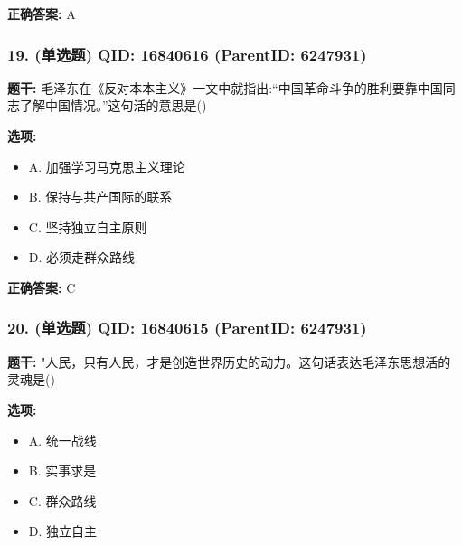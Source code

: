 \documentclass[12pt,UTF8]{ctexart}
\begin{document}
\textbf{正确答案:}
A

\vspace{0.3em}\hrulefill\vspace{0.7em}

\subsubsection*{19. (单选题) \small QID: 16840616 (ParentID: 6247931)}

\textbf{题干:}
毛泽东在《反对本本主义》一文中就指出:“中国革命斗争的胜利要靠中国同志了解中国情况。”这句活的意思是()



\textbf{选项:}
\begin{itemize}[leftmargin=*]

  \item A. 加强学习马克思主义理论

  \item B. 保持与共产国际的联系

  \item C. 坚持独立自主原则

  \item D. 必须走群众路线

\end{itemize}

\textbf{正确答案:}
C

\vspace{0.3em}\hrulefill\vspace{0.7em}

\subsubsection*{20. (单选题) \small QID: 16840615 (ParentID: 6247931)}

\textbf{题干:}
"人民，只有人民，才是创造世界历史的动力。这句话表达毛泽东思想活的灵魂是()



\textbf{选项:}
\begin{itemize}[leftmargin=*]

  \item A. 统一战线

  \item B. 实事求是

  \item C. 群众路线

  \item D. 独立自主

\end{itemize}
\end{document}
